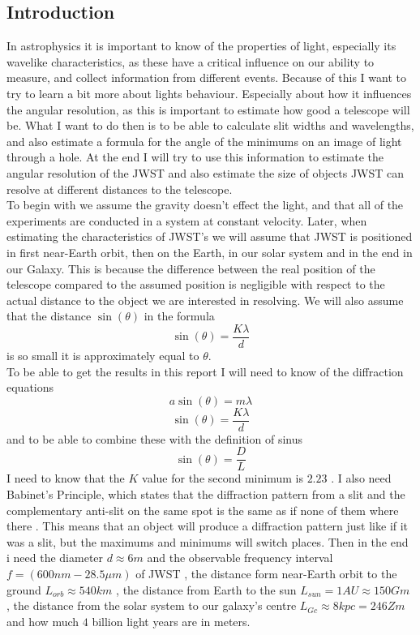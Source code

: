 \documentclass[11pt, A4paper, english]{article}
\begin{document}
	\begin{multicols}{2}
		\section{Introduction}
In astrophysics it is important to know of the properties of light, especially its wavelike characteristics, as these have a critical influence on our ability to measure, and collect information from different events. Because of this I want to try to learn a bit more about lights behaviour. Especially about how it influences the angular resolution, as this is important to estimate how good a telescope will be. What I want to do then is to be able to calculate slit widths and wavelengths, and also estimate a formula for the angle of the minimums on an image of light through a hole. At the end I will try to use this information to estimate the angular resolution of the JWST and also estimate the size of objects JWST can resolve at different distances to the telescope. \\
To begin with we assume the gravity doesn't effect the light, and that all of the experiments are conducted in a system at constant velocity. Later, when estimating the characteristics of JWST's we will assume that JWST is positioned in first near-Earth orbit, then on the Earth, in our solar system and in the end in our Galaxy. This is because the difference between the real position of the telescope compared to the assumed position is negligible with respect to the actual distance to the object we are interested in resolving.  We will also assume that the distance $\sin(\theta)$ in the formula
$$\sin(\theta) = \frac{K \lambda}{d}$$
is so small it is approximately equal to $\theta$. \\
To be able to get the results in this report I will need to know of the diffraction equations
$$a \sin(\theta) = m \lambda$$
$$\sin( \theta) = \frac{K \lambda}{d}$$
and to be able to combine these with the definition of sinus
$$\sin(\theta) = \frac{D}{L}$$
I need to know that the $K$ value for the second minimum is $2.23$ \cite{labinstruks}. I also need Babinet's Principle, which states that the diffraction pattern from a slit and the complementary anti-slit on the same spot is the same as if none of them where there \cite{Babinet}. This means that an object will produce a diffraction pattern just like if it was a slit, but the maximums and minimums will switch places. Then in the end i need the diameter $d \approx 6 m$ and the observable frequency interval $f = (600 nm - 28.5 \mu m)$ of JWST \cite{JWST}, the distance form near-Earth orbit to the ground $L_{orb} \approx 540 km$ \cite{labinstruks}, the distance from Earth to the sun $L_{sun} = 1 AU \approx 150 Gm$ \cite{SunEarth}, the distance from the solar system to our galaxy's centre $L_{Gc} \approx 8 kpc = 246 Zm$ \cite{GalaCenter} and how much $4$ billion light years are in meters.



\end{multicols}
\end{document}
